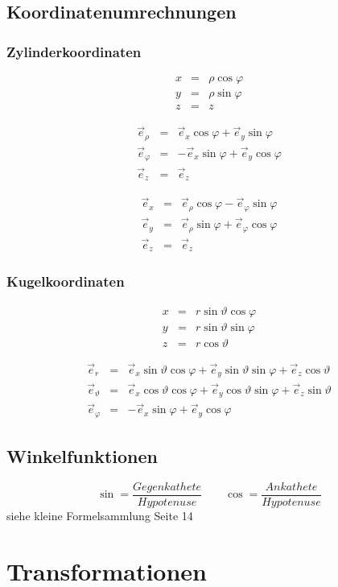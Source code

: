 \subsection{Koordinatenumrechnungen}
\subsubsection{Zylinderkoordinaten}
\parbox{3cm}{\begin{eqnarray*}
 x&=&\rho \cos \varphi \\
 y&=&\rho \sin \varphi \\
 z&=&z
 \end{eqnarray*}}\hfill
\parbox{6cm}{\begin{eqnarray*}
 \vec{e}_{\rho}&=&\vec{e}_x\cos\varphi + \vec{e}_y\sin\varphi\\
 \vec{e}_{\varphi}&=&-\vec{e}_x\sin\varphi + \vec{e}_y\cos\varphi\\
 \vec{e}_z&=&\vec{e}_z
 \end{eqnarray*}}\hfill
\parbox{6cm}{\begin{eqnarray*}
 \vec{e}_x&=&\vec{e}_{\rho}\cos\varphi - \vec{e}_{\varphi}\sin\varphi\\
 \vec{e}_y&=&\vec{e}_{\rho}\sin\varphi + \vec{e}_{\varphi}\cos\varphi\\
 \vec{e}_z&=&\vec{e}_z
 \end{eqnarray*}}

\subsubsection{Kugelkoordinaten}
\parbox{5cm}{\begin{eqnarray*}
 x&=&r\sin\vartheta \cos\varphi \\
 y&=&r\sin\vartheta \sin\varphi \\
 z&=&r\cos\vartheta
 \end{eqnarray*}}
\parbox{10cm}{\begin{eqnarray*}
\vec{e}_r&=&\vec{e}_x\sin\vartheta\cos\varphi + \vec{e}_y\sin\vartheta\sin
  \varphi+\vec{e}_z\cos\vartheta\\
\vec{e}_{\vartheta}&=&\vec{e}_x\cos\vartheta\cos\varphi + \vec{e}_y\cos
  \vartheta\sin\varphi+\vec{e}_z\sin\vartheta\\
\vec{e}_{\varphi}&=&-\vec{e}_x\sin\varphi + \vec{e}_y\cos\varphi
\end{eqnarray*}}

\subsection{Winkelfunktionen} $$\sin = \frac{Gegenkathete}{Hypotenuse} \qquad \cos = \frac{Ankathete}{Hypotenuse}$$ siehe kleine Formelsammlung Seite 14
\clearpage \section{Transformationen}
